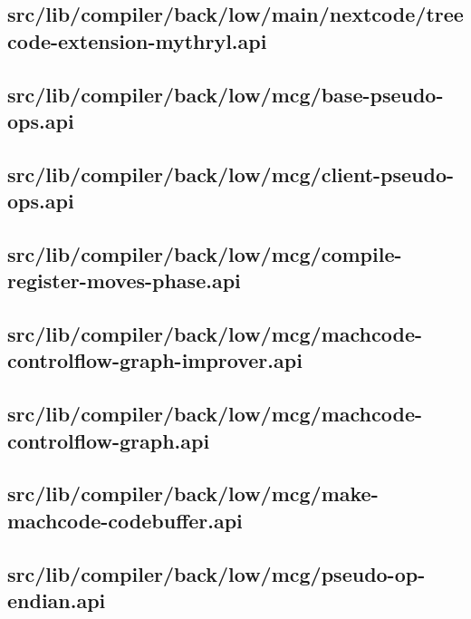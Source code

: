 \subsection{src/lib/compiler/back/low/main/nextcode/treecode-extension-mythryl.api}


\subsection{src/lib/compiler/back/low/mcg/base-pseudo-ops.api}


\subsection{src/lib/compiler/back/low/mcg/client-pseudo-ops.api}


\subsection{src/lib/compiler/back/low/mcg/compile-register-moves-phase.api}


\subsection{src/lib/compiler/back/low/mcg/machcode-controlflow-graph-improver.api}


\subsection{src/lib/compiler/back/low/mcg/machcode-controlflow-graph.api}


\subsection{src/lib/compiler/back/low/mcg/make-machcode-codebuffer.api}


\subsection{src/lib/compiler/back/low/mcg/pseudo-op-endian.api}


